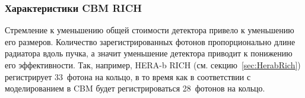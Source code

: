 


\subsubsection{Характеристики CBM RICH}\label{sec:CbmRichChar}




Стремление к уменьшению общей стоимости детектора привело к уменьшению его размеров. Количество зарегистрированных фотонов пропорционально длине радиатора вдоль пучка, а значит уменьшение детектора приводит к понижению его эффективности.
Так, например, HERA-b RICH (см. секцию~\ref{sec:HerabRich}) регистрирует 33~фотона на кольцо, в то время как в соответствии с моделированием в CBM будет регистрироваться 28~фотонов на кольцо.

